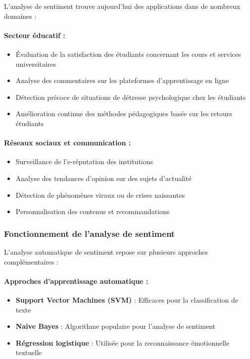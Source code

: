 L'analyse de sentiment trouve aujourd'hui des applications dans de nombreux domaines :

\paragraph{Secteur éducatif :}
\begin{itemize}
    \item Évaluation de la satisfaction des étudiants concernant les cours et services universitaires
    \item Analyse des commentaires sur les plateformes d'apprentissage en ligne
    \item Détection précoce de situations de détresse psychologique chez les étudiants
    \item Amélioration continue des méthodes pédagogiques basée sur les retours étudiants
\end{itemize}

\paragraph{Réseaux sociaux et communication :}
\begin{itemize}
    \item Surveillance de l'e-réputation des institutions
    \item Analyse des tendances d'opinion sur des sujets d'actualité
    \item Détection de phénomènes viraux ou de crises naissantes
    \item Personnalisation des contenus et recommandations
\end{itemize}

\subsubsection{Fonctionnement de l'analyse de sentiment}

L'analyse automatique de sentiment repose sur plusieurs approches complémentaires :

\paragraph{Approches d'apprentissage automatique :}
\begin{itemize}
    \item \textbf{Support Vector Machines (SVM)} : Efficaces pour la classification de texte
    \item \textbf{Naive Bayes} : Algorithme populaire pour l'analyse de sentiment
    \item \textbf{Régression logistique} : Utilisée pour la reconnaissance émotionnelle textuelle
\end{itemize}


